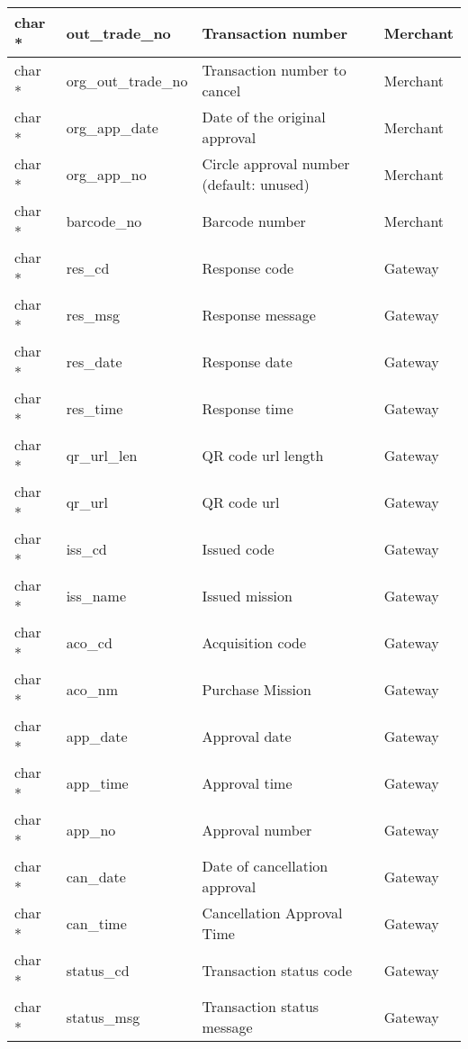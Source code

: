 \documentclass[12pt]{article}
\begin{document}
\begin{center}
\begin{tabular}{ |l |l |l |l| }
        \hline
        char *  & out\_trade\_no & Transaction number & Merchant \\
        \hline
        char *  & org\_out\_trade\_no & Transaction number to cancel & Merchant \\
        \hline
        char *  & org\_app\_date & Date of the original approval & Merchant \\
        \hline
        char *  & org\_app\_no & Circle approval number (default: unused) & Merchant \\
        \hline
        char *  & barcode\_no & Barcode number & Merchant \\
        \hline
        char *  & res\_cd & Response code & Gateway \\
        \hline
        char *  & res\_msg & Response message & Gateway \\
        \hline
        char *  & res\_date & Response date & Gateway \\
        \hline
        char *  & res\_time & Response time & Gateway \\
        \hline
        char *  & qr\_url\_len & QR code url length & Gateway \\
        \hline
        char *  & qr\_url & QR code url & Gateway \\
        \hline
        char *  & iss\_cd & Issued code & Gateway \\
        \hline
        char *  & iss\_name & Issued mission & Gateway \\
        \hline
        char *  & aco\_cd & Acquisition code & Gateway \\
        \hline
        char *  & aco\_nm & Purchase Mission & Gateway \\

        \hline
        char *  & app\_date & Approval date & Gateway \\
        \hline
        char *  & app\_time & Approval time & Gateway \\
        \hline
        char *  & app\_no & Approval number & Gateway \\

        \hline
        char *  & can\_date & Date of cancellation approval & Gateway \\
        \hline
        char *  & can\_time & Cancellation Approval Time & Gateway \\
        
        \hline
        char *  & status\_cd & Transaction status code & Gateway \\
        \hline
        char *  & status\_msg & Transaction status message & Gateway \\
        \hline
       
    \end{tabular}
\end{center}
\end{document}

